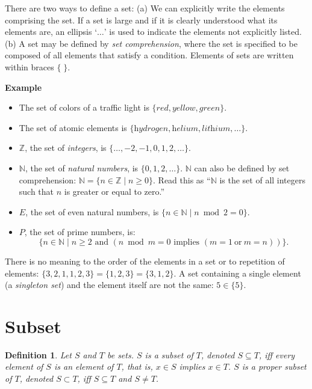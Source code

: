 \documentclass[12pt,a4paper]{article}
\newtheorem{definition}[theorem]{Definition}
\newenvironment{example}{\textbf{Example}}{}
\begin{document}
There are two ways to define a set: (a) We can explicitly write the
elements comprising the set. If a set is large and if it is clearly
understood what its elements are, an ellipsis `$\ldots$' is used to
indicate the elements not explicitly listed. (b) A set may be defined by
\emph{set comprehension}, where the set is specified to be composed of
all elements that satisfy a condition. Elements of sets are written within braces $\{\;\}$.


\begin{example}\mbox{}
\begin{itemize}
\item The set of colors of a traffic light is $\{\textit{red}, \textit{yellow}, \textit{green}\}$.

\item The set of atomic elements is $\{\textit{hydrogen}, \textit{helium}, \textit{lithium}, \ldots\}$.

\item $\mathbb{Z}$, the set of
\emph{integers}, is $\{\ldots,-2,-1,0,1,2,\ldots\}$.

\item $\mathbb{N}$, the set of \emph{natural numbers}, is $\{0,1,2,\ldots\}$. $\mathbb{N}$ can also be defined by set comprehension: $\mathbb{N}=\{n\in \mathbb{Z} \mid n\geq 0\}$. Read this as ``$\mathbb{N}$ is the set of all integers such that $n$ is greater or equal to zero.''

\item $E$, the set of even natural numbers, is $\{n\in \mathbb{N} \mid n \bmod 2 = 0\}$.

\item $P$, the set of prime numbers, is:
\[
\{n\in \mathbb{N} \mid n\geq 2 \textrm{\ and\ } (n \bmod m = 0 \textrm{\ implies\ } (m=1 \mathrm{\ or\ } m=n))\}.
\]
\end{itemize}
\end{example}

There is no meaning to the order of the elements in a set or to
repetition of elements: $\{3,2,1,1,2,3\}=\{1,2,3\}=\{3,1,2\}$.
A set containing a single element (a \emph{singleton set})
and the element itself are not the same: $5\in \{5\}$.

\section{Subset}

\begin{definition}
Let $S$ and $T$ be sets. $S$ is a \emph{subset} of
$T$, denoted $S\subseteq T$, iff every element of
$S$ is an element of $T$, that is, $x\in S$ implies $x \in T$. $S$ is a
\emph{proper subset} of $T$, denoted $S\subset
T$, iff $S\subseteq T$ and $S\neq T$.
\end{definition}
\end{document}
